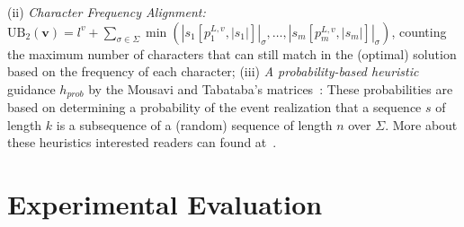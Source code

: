 \documentclass[runningheads]{llncs}
\begin{document}
(ii)  \textit{Character Frequency Alignment:}
$\textrm{UB}_2(\mathbf{v}) =  l^v + \sum_{\sigma \in \Sigma} 
\min\left(  |s_1[p_1^{L, v}, |s_1|]|_{\sigma}, \ldots, |s_m[p_m^{L, v}, |s_m|]|_{\sigma} \right)$,  counting the maximum number of characters that can still match in the (optimal) solution based on the frequency of each character; %
(iii) \textit{A probability-based heuristic} guidance $h_{prob}$ by the Mousavi and Tabataba's matrices~\cite{mousavi2012improved}:  These probabilities are based on determining a probability of the event realization that a sequence $s$ of length $k$ is a subsequence of a (random) sequence of length $n$ over $\Sigma$.  %
     More about these heuristics interested readers can found at~\cite{DJUKANOVIC2020106499,mousavi2012improved}. 
     
	
\section{Experimental Evaluation}\label{sec: experiments}
   
\end{document}
